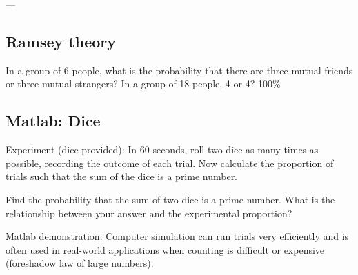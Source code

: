 \documentclass[12pt]{article}
\begin{document}
---

\subsection{Ramsey theory}
In a group of $6$ people, what is the probability that there are three mutual friends or three mutual strangers?  In a group of 18 people, 4 or 4?  100\%

\subsection{Matlab: Dice}

Experiment (dice provided): In 60 seconds, roll two dice as many times as possible, recording the outcome of each trial.  Now calculate the proportion of trials such that the sum of the dice is a prime number.

Find the probability that the sum of two dice is a prime number.  What is the relationship between your answer and the experimental proportion?

Matlab demonstration: Computer simulation can run trials very efficiently and is often used in real-world applications when counting is difficult or expensive (foreshadow law of large numbers).
\end{document}
